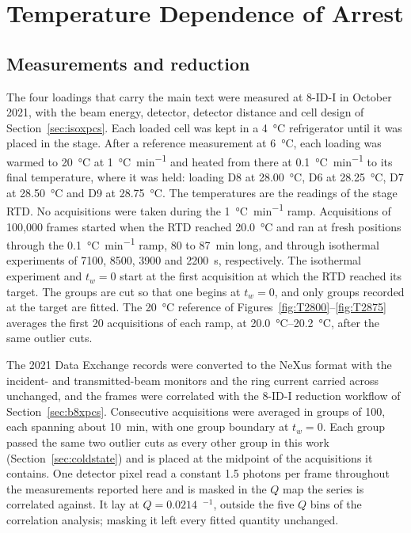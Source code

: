 \documentclass[11pt]{article}
\newcommand{\Ainv}{\text{\AA}$^{-1}$}
\begin{document}
\section{Temperature Dependence of Arrest}
\label{sec:tdep}
\subsection{Measurements and reduction}
\label{sec:tdepdata}
The four loadings that carry the main text were measured at 8-ID-I in October 2021, with the beam energy, detector, detector distance and cell design of Section~\ref{sec:isoxpcs}. Each loaded cell was kept in a \SI{4}{\degreeCelsius} refrigerator until it was placed in the stage. After a reference measurement at \SI{6}{\degreeCelsius}, each loading was warmed to \SI{20}{\degreeCelsius} at \SI{1}{\degreeCelsius\per\minute} and heated from there at \SI{0.1}{\degreeCelsius\per\minute} to its final temperature, where it was held: loading D8 at \SI{28.00}{\degreeCelsius}, D6 at \SI{28.25}{\degreeCelsius}, D7 at \SI{28.50}{\degreeCelsius} and D9 at \SI{28.75}{\degreeCelsius}. The temperatures are the readings of the stage RTD. No acquisitions were taken during the \SI{1}{\degreeCelsius\per\minute} ramp. Acquisitions of 100,000 frames started when the RTD reached \SI{20.0}{\degreeCelsius} and ran at fresh positions through the \SI{0.1}{\degreeCelsius\per\minute} ramp, 80 to \SI{87}{\minute} long, and through isothermal experiments of 7100, 8500, 3900 and \SI{2200}{\second}, respectively. The isothermal experiment and $t_w=0$ start at the first acquisition at which the RTD reached its target. The groups are cut so that one begins at $t_w=0$, and only groups recorded at the target are fitted. The \SI{20}{\degreeCelsius} reference of Figures~\ref{fig:T2800}--\ref{fig:T2875} averages the first 20 acquisitions of each ramp, at \SIrange{20.0}{20.2}{\degreeCelsius}, after the same outlier cuts.

The 2021 Data Exchange records were converted to the NeXus format with the incident- and transmitted-beam monitors and the ring current carried across unchanged, and the frames were correlated with the 8-ID-I reduction workflow of Section~\ref{sec:b8xpcs}. Consecutive acquisitions were averaged in groups of 100, each spanning about \SI{10}{\minute}, with one group boundary at $t_w=0$. Each group passed the same two outlier cuts as every other group in this work (Section~\ref{sec:coldstate}) and is placed at the midpoint of the acquisitions it contains. One detector pixel read a constant 1.5 photons per frame throughout the measurements reported here and is masked in the $Q$ map the series is correlated against. It lay at $Q=0.0214$~\Ainv, outside the five $Q$ bins of the correlation analysis; masking it left every fitted quantity unchanged.
\end{document}
